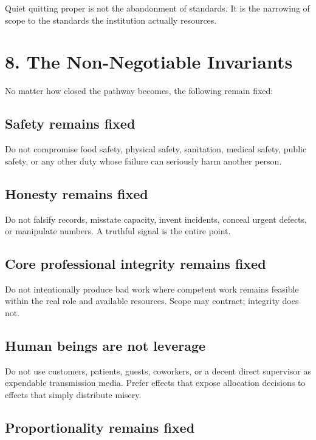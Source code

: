 \documentclass[11pt,oneside]{article}
\begin{document}
Quiet quitting proper is not the abandonment of standards. It is the narrowing of scope to the standards the institution actually resources.

\section{8. The Non-Negotiable Invariants}\label{the-non-negotiable-invariants}

No matter how closed the pathway becomes, the following remain fixed:

\subsection{Safety remains fixed}\label{safety-remains-fixed}

Do not compromise food safety, physical safety, sanitation, medical safety, public safety, or any other duty whose failure can seriously harm another person.

\subsection{Honesty remains fixed}\label{honesty-remains-fixed}

Do not falsify records, misstate capacity, invent incidents, conceal urgent defects, or manipulate numbers. A truthful signal is the entire point.

\subsection{Core professional integrity remains fixed}\label{core-professional-integrity-remains-fixed}

Do not intentionally produce bad work where competent work remains feasible within the real role and available resources. Scope may contract; integrity does not.

\subsection{Human beings are not leverage}\label{human-beings-are-not-leverage}

Do not use customers, patients, guests, coworkers, or a decent direct supervisor as expendable transmission media. Prefer effects that expose allocation decisions to effects that simply distribute misery.

\subsection{Proportionality remains fixed}\label{proportionality-remains-fixed}
\end{document}

